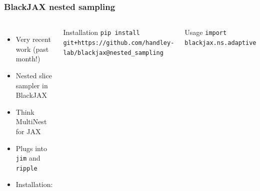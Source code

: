\documentclass[aspectratio=169]{beamer}
\begin{document}
\begin{frame}
    \frametitle{BlackJAX nested sampling}
    \begin{columns}
        \begin{itemize}
            \item Very recent work (past month!)
            \item Nested slice sampler in BlackJAX
            \item Think MultiNest for JAX
            \item Plugs into \texttt{jim} and \texttt{ripple}
            \item Installation:
        \end{itemize}
        \begin{block}{Installation}
            \texttt{pip install git+https://github.com/handley-lab/blackjax@nested\_sampling}
        \end{block}
        \begin{block}{Usage}
            \texttt{import blackjax.ns.adaptive}
        \end{block}
        \includegraphics[width=\textwidth]{people/david_yallup.jpg}
    \end{columns}
\end{frame}
\end{document}
